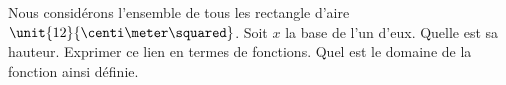 
\begin{exercice}\label{exoSeconde-0057}

    Nous considérons l'ensemble de tous les rectangle d'aire \( \unit{12}{\centi\meter\squared}\). Soit \( x\) la base de l'un d'eux. Quelle est sa hauteur. Exprimer ce lien en termes de fonctions. Quel est le domaine de la fonction ainsi définie.

\end{exercice}
